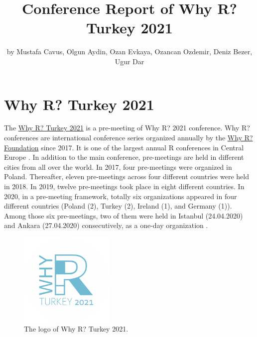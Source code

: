 \title{Conference Report of Why R? Turkey 2021}
\author{by Mustafa Cavus, Olgun Aydin, Ozan Evkaya, Ozancan Ozdemir, Deniz Bezer, Ugur Dar}

\maketitle


\section{Why R? Turkey 2021}

The \href{whyr.pl/2021/turkey/}{Why R? Turkey 2021} is a pre-meeting of Why R? 2021 conference. Why R? conferences are international conference series organized annually by the \href{whyr.pl}{Why R? Foundation} since 2017. It is one of the largest annual R conferences in Central Europe \citep{why2019}. In addition to the main conference, pre-meetings are held in different cities from all over the world. In 2017, four pre-meetings were organized in Poland. Thereafter, eleven pre-meetings across four different countries were held in 2018. In 2019, twelve pre-meetings took place in eight different countries. In 2020, in a pre-meeting framework, totally  six organizations appeared in four different countries (Poland (2), Turkey (2), Ireland (1), and Germany (1)). Among those six pre-meetings, two of them were held in Istanbul (24.04.2020) and Ankara (27.04.2020) consecutively, as a one-day organization \citep{whyrEvents}. \\

\begin{figure}[h]
  \centering
  \includegraphics[width=0.4\textwidth]{logo.png}
  \caption{The logo of Why R? Turkey 2021.}
  \label{figure:rlogo}
\end{figure} 

